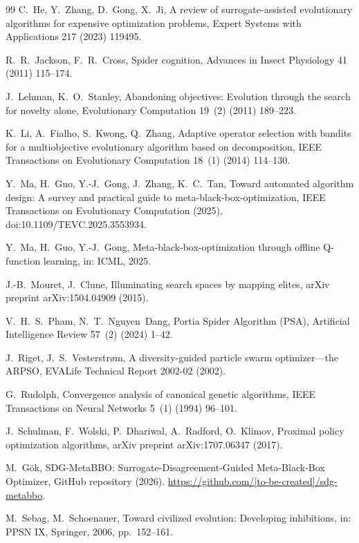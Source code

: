 \documentclass[preprint,12pt,number]{elsarticle}
\begin{document}
\begin{thebibliography}{99}
C.~He, Y.~Zhang, D.~Gong, X.~Ji, A review of surrogate-assisted evolutionary algorithms for expensive optimization problems, Expert Systems with Applications 217 (2023) 119495.

R.~R.~Jackson, F.~R.~Cross, Spider cognition, Advances in Insect Physiology 41 (2011) 115--174.

J.~Lehman, K.~O.~Stanley, Abandoning objectives: Evolution through the search for novelty alone, Evolutionary Computation 19~(2) (2011) 189--223.

K.~Li, A.~Fialho, S.~Kwong, Q.~Zhang, Adaptive operator selection with bandits for a multiobjective evolutionary algorithm based on decomposition, IEEE Transactions on Evolutionary Computation 18~(1) (2014) 114--130.

Y.~Ma, H.~Guo, Y.-J.~Gong, J.~Zhang, K.~C.~Tan, Toward automated algorithm design: A survey and practical guide to meta-black-box-optimization, IEEE Transactions on Evolutionary Computation (2025), doi:10.1109/TEVC.2025.3553934.

Y.~Ma, H.~Guo, Y.-J.~Gong, Meta-black-box-optimization through offline Q-function learning, in: ICML, 2025.

J.-B.~Mouret, J.~Clune, Illuminating search spaces by mapping elites, arXiv preprint arXiv:1504.04909 (2015).

V.~H.~S.~Pham, N.~T.~Nguyen~Dang, Portia Spider Algorithm (PSA), Artificial Intelligence Review 57~(2) (2024) 1--42.

J.~Riget, J.~S.~Vesterstr{\o}m, A diversity-guided particle swarm optimizer---the ARPSO, EVALife Technical Report 2002-02 (2002).

G.~Rudolph, Convergence analysis of canonical genetic algorithms, IEEE Transactions on Neural Networks 5~(1) (1994) 96--101.

J.~Schulman, F.~Wolski, P.~Dhariwal, A.~Radford, O.~Klimov, Proximal policy optimization algorithms, arXiv preprint arXiv:1707.06347 (2017).

M.~G\"ok, SDG-MetaBBO: Surrogate-Disagreement-Guided Meta-Black-Box Optimizer, GitHub repository (2026). \url{https://github.com/[to-be-created]/sdg-metabbo}.

M.~Sebag, M.~Schoenauer, Toward civilized evolution: Developing inhibitions, in: PPSN IX, Springer, 2006, pp.~152--161.


\end{thebibliography}
\end{document}
